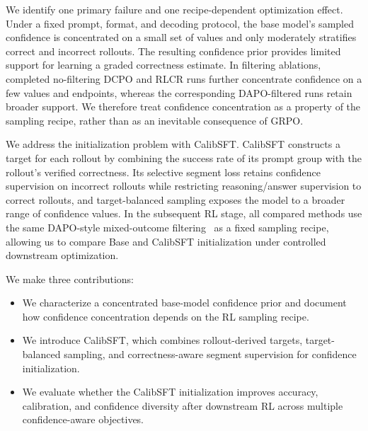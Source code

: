 %

We identify one primary failure and one recipe-dependent optimization effect. Under a fixed prompt, format, and decoding protocol, the base model's sampled confidence is concentrated on a small set of values and only moderately stratifies correct and incorrect rollouts. The resulting confidence prior provides limited support for learning a graded correctness estimate. In filtering ablations, completed no-filtering DCPO and RLCR runs further concentrate confidence on a few values and endpoints, whereas the corresponding DAPO-filtered runs retain broader support. We therefore treat confidence concentration as a property of the sampling recipe, rather than as an inevitable consequence of GRPO.

We address the initialization problem with CalibSFT. CalibSFT constructs a target for each rollout by combining the success rate of its prompt group with the rollout's verified correctness. Its selective segment loss retains confidence supervision on incorrect rollouts while restricting reasoning/answer supervision to correct rollouts, and target-balanced sampling exposes the model to a broader range of confidence values. In the subsequent RL stage, all compared methods use the same DAPO-style mixed-outcome filtering~\citep{yu2025dapo} as a fixed sampling recipe, allowing us to compare Base and CalibSFT initialization under controlled downstream optimization.

We make three contributions:
\begin{itemize}[leftmargin=*]
    \item We characterize a concentrated base-model confidence prior and document how confidence concentration depends on the RL sampling recipe.
    \item We introduce CalibSFT, which combines rollout-derived targets, target-balanced sampling, and correctness-aware segment supervision for confidence initialization.
    \item We evaluate whether the CalibSFT initialization improves accuracy, calibration, and confidence diversity after downstream RL across multiple confidence-aware objectives.
\end{itemize}
